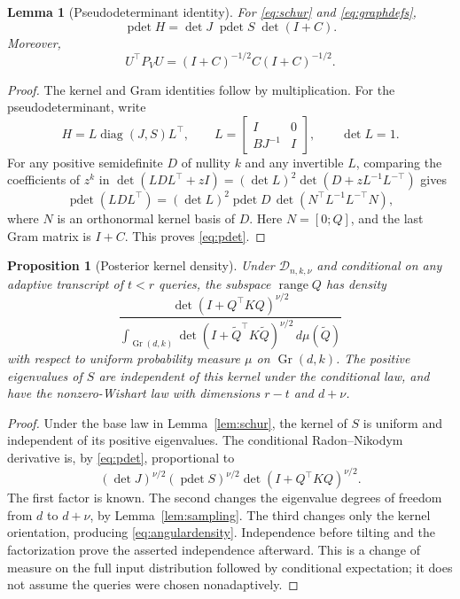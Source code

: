 \documentclass[11pt]{article}
\numberwithin{equation}{section}
\newtheorem{lemma}[theorem]{Lemma}
\newtheorem{proposition}[theorem]{Proposition}
\theoremstyle{remark}\newtheorem{remark}[theorem]{Remark}
\newcommand{\range}{\operatorname{range}}
\newcommand{\diag}{\operatorname{diag}}
\newcommand{\Gr}{\operatorname{Gr}}
\newcommand{\pdet}{\operatorname{pdet}}
\newcommand{\calD}{\mathcal D}
\begin{document}
\begin{lemma}[Pseudodeterminant identity]\label{lem:pdet}
For \eqref{eq:schur} and \eqref{eq:graphdefs},
\begin{equation}\label{eq:pdet}
\pdet H=\det J\;\pdet S\;\det(I+C).
\end{equation}
Moreover,
\begin{equation}\label{eq:overlapgraph}
U^\top P_VU=(I+C)^{-1/2}C(I+C)^{-1/2}.
\end{equation}
\end{lemma}
\begin{proof}
The kernel and Gram identities follow by multiplication. For the pseudodeterminant, write
\[
H=L\diag(J,S)L^\top,\qquad
L=\begin{bmatrix}I&0\\ BJ^{-1}&I\end{bmatrix},\qquad \det L=1.
\]
For any positive semidefinite $D$ of nullity $k$ and any invertible $L$, comparing the coefficients of $z^k$ in
$\det(LDL^\top+zI)=(\det L)^2\det(D+zL^{-1}L^{-\top})$ gives
\[
\pdet(LDL^\top)=(\det L)^2\pdet D\,
\det(N^\top L^{-1}L^{-\top}N),
\]
where $N$ is an orthonormal kernel basis of $D$. Here $N=[0;Q]$, and the last Gram matrix is $I+C$. This proves \eqref{eq:pdet}.
\end{proof}

\begin{proposition}[Posterior kernel density]\label{prop:posterior}
Under $\calD_{n,k,\nu}$ and conditional on any adaptive transcript of $t<r$ queries, the subspace $\range Q$ has density
\begin{equation}\label{eq:angulardensity}
\frac{\det(I+Q^\top KQ)^{\nu/2}}
{\int_{\Gr(d,k)}\det(I+\widetilde Q^\top K\widetilde Q)^{\nu/2}\,d\mu(\widetilde Q)}
\end{equation}
with respect to uniform probability measure $\mu$ on $\Gr(d,k)$. The positive eigenvalues of $S$ are independent of this kernel under the conditional law, and have the nonzero-Wishart law with dimensions $r-t$ and $d+\nu$.
\end{proposition}
\begin{proof}
Under the base law in Lemma~\ref{lem:schur}, the kernel of $S$ is uniform and independent of its positive eigenvalues. The conditional Radon--Nikodym derivative is, by \eqref{eq:pdet}, proportional to
\[
(\det J)^{\nu/2}(\pdet S)^{\nu/2}
\det(I+Q^\top KQ)^{\nu/2}.
\]
The first factor is known. The second changes the eigenvalue degrees of freedom from $d$ to $d+\nu$, by Lemma~\ref{lem:sampling}. The third changes only the kernel orientation, producing \eqref{eq:angulardensity}. Independence before tilting and the factorization prove the asserted independence afterward. This is a change of measure on the full input distribution followed by conditional expectation; it does not assume the queries were chosen nonadaptively.
\end{proof}
\end{document}
